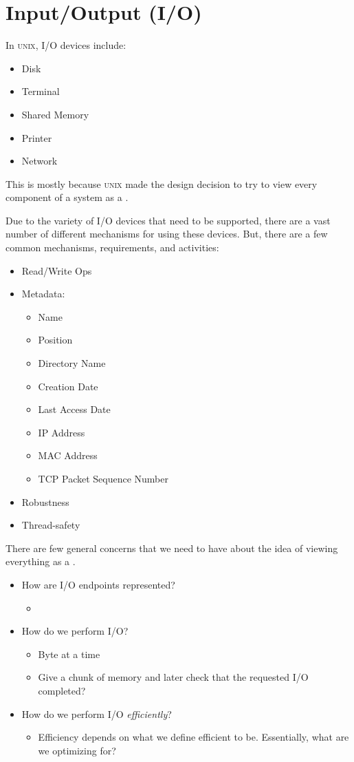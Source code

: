 \section{Input/Output (I/O)}\label{sec:IO}
In \textsc{unix}, I/O devices include:
\begin{itemize}[noitemsep]
\item Disk
\item Terminal
\item Shared Memory
\item Printer
\item Network
\end{itemize}

This is mostly because \textsc{unix} made the design decision to try to view every component of a system as a .

Due to the variety of I/O devices that need to be supported, there are a vast number of different mechanisms for using these devices.
But, there are a few common mechanisms, requirements, and activities:
\begin{itemize}[noitemsep]
\item Read/Write Ops
\item Metadata:
  \begin{itemize}[noitemsep]
  \item Name
  \item Position
  \item Directory Name
  \item Creation Date
  \item Last Access Date
  \item IP Address
  \item MAC Address
  \item TCP Packet Sequence Number
  \end{itemize}
\item Robustness
\item Thread-safety
\end{itemize}

There are few general concerns that we need to have about the idea of viewing everything as a .
\begin{itemize}[noitemsep]
\item How are I/O endpoints represented?
  \begin{itemize}[noitemsep]
  \item {}
  \end{itemize}
\item How do we perform I/O?\@
  \begin{itemize}[noitemsep]
  \item Byte at a time
  \item Give a chunk of memory and later check that the requested I/O completed?
  \end{itemize}
\item How do we perform I/O \emph{efficiently}?
  \begin{itemize}[noitemsep]
  \item Efficiency depends on what we define efficient to be. Essentially, what are we optimizing for?
  \end{itemize}
\end{itemize}

